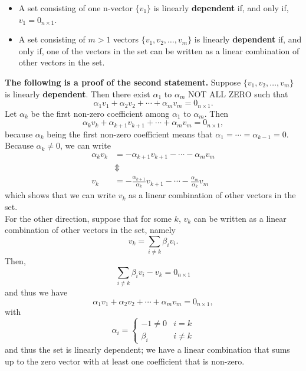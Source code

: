 \documentclass[letterpaper]{book}
\begin{document}
\begin{tcolorbox}[[sharp corners, colback=lightergray, colframe=red, title=\textbf{\Large  Remark on Sets of Linearly Dependent Vectors}] \Large 

\begin{itemize}
    \item A set consisting of one n-vector $\{v_1 \}$ is linearly \textbf{dependent} if, and only if, $v_1 = 0_{n \times 1}$. 

    \item A set consisting of $m>1$ vectors $\{v_1, v_2, \ldots, v_m \}$ is linearly \textbf{dependent} if, and only if, one of the vectors in the set can be written as a linear combination of other vectors in the set.    
    
\end{itemize}
\end{tcolorbox}
\vspace*{0.2cm}
\textbf{The following is a proof of the second statement.} Suppose $\{v_1, v_2, \ldots, v_m \}$ is linearly \textbf{dependent}. Then there exist $\alpha_1$ to $\alpha_m$ NOT ALL ZERO such that 
$$ \alpha_1 v_1 + \alpha_2 v_2 + \cdots + \alpha_m v_m = 0_{n \times 1}.$$
Let $\alpha_k$ be the first non-zero coefficient among $\alpha_1$ to $\alpha_m$. Then 
$$ \alpha_k v_k + \alpha_{k+1} v_{k+1} + \cdots + \alpha_m v_m = 0_{n \times 1},$$
because $\alpha_k$ being the first non-zero coefficient means that $\alpha_1 = \cdots = \alpha_{k-1}=0$. 
Because $\alpha_k \neq 0$, we can write
\begin{align*} 
\alpha_k v_k & = -\alpha_{k+1} v_{k+1} - \cdots - \alpha_m v_m \\
& \Updownarrow \\
v_k & = - \frac{\alpha_{k+1}}{\alpha_k} v_{k+1} - \cdots - \frac{\alpha_{m}}{\alpha_k}v_m 
\end{align*}
which shows that we can write $v_k$ as a linear combination of other vectors in the set.\\

For the other direction, suppose that for some $k$, $v_k$ can be written as a linear combination of other vectors in the set, namely
$$ v_k = \sum_{i \neq k} \beta_i v_i.$$
Then, 
$$ \sum_{i \neq k} \beta_i v_i -v_k = 0_{n \times 1} $$
and thus we have
$$ \alpha_1 v_1 + \alpha_2 v_2 + \cdots + \alpha_m v_m = 0_{n \times 1},$$
with 
$$ \alpha_i = \begin{cases}
    -1 \neq 0 & i = k \\
    \beta_i & i \neq k
\end{cases}
 $$
 and thus the set is linearly dependent; we have a linear combination that sums up to the zero vector with at least one coefficient that is non-zero. \Qed \\
\end{document}
